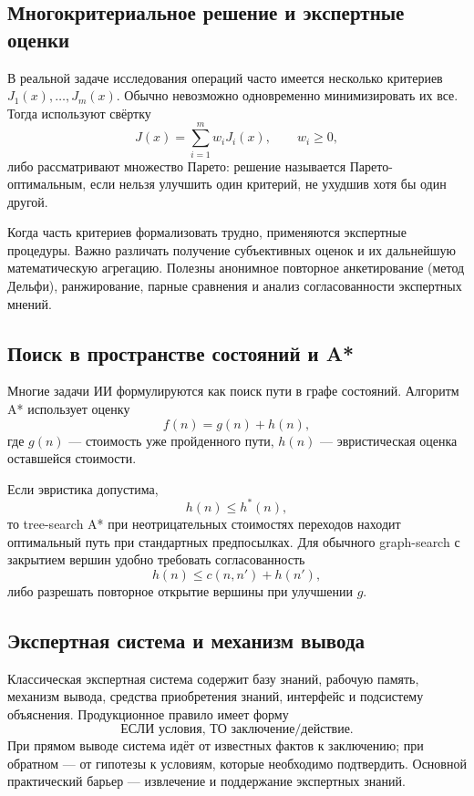 \subsection{Многокритериальное решение и экспертные оценки}

В реальной задаче исследования операций часто имеется несколько критериев
$J_1(x),\ldots,J_m(x)$. Обычно невозможно одновременно минимизировать их все.
Тогда используют свёртку
\[
J(x)=\sum_{i=1}^{m}w_iJ_i(x),\qquad w_i\ge0,
\]
либо рассматривают множество Парето: решение называется Парето-оптимальным,
если нельзя улучшить один критерий, не ухудшив хотя бы один другой.

Когда часть критериев формализовать трудно, применяются экспертные процедуры.
Важно различать получение субъективных оценок и их дальнейшую математическую
агрегацию. Полезны анонимное повторное анкетирование (метод Дельфи), ранжирование,
парные сравнения и анализ согласованности экспертных мнений.

\subsection{Поиск в пространстве состояний и A*}

Многие задачи ИИ формулируются как поиск пути в графе состояний. Алгоритм A*
использует оценку
\[
f(n)=g(n)+h(n),
\]
где $g(n)$ --- стоимость уже пройденного пути, $h(n)$ --- эвристическая оценка
оставшейся стоимости.

Если эвристика допустима,
\[
h(n)\le h^*(n),
\]
то tree-search A* при неотрицательных стоимостях переходов находит оптимальный путь при стандартных предпосылках. Для
обычного graph-search с закрытием вершин удобно требовать согласованность
\[
h(n)\le c(n,n')+h(n'),
\]
либо разрешать повторное открытие вершины при улучшении $g$.

\subsection{Экспертная система и механизм вывода}

Классическая экспертная система содержит базу знаний, рабочую память,
механизм вывода, средства приобретения знаний, интерфейс и подсистему объяснения.
Продукционное правило имеет форму
\[
\text{ЕСЛИ условия, ТО заключение/действие}.
\]
При прямом выводе система идёт от известных фактов к заключению; при обратном ---
от гипотезы к условиям, которые необходимо подтвердить. Основной практический
барьер --- извлечение и поддержание экспертных знаний.

